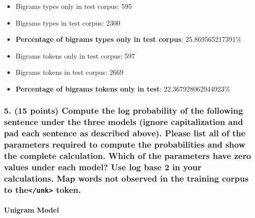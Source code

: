 \documentclass{article}
\begin{document}
\begin{itemize}
\item Bigrams types only in test corpus: 595
\item Bigrams types in test corpus: 2300
\item \textbf{Percentage of bigrams types only in test corpus}: 25.869565217391\%
\item Bigrams tokens only in test corpus: 597
\item Bigrams tokens in test corpus: 2669
\item \textbf{Percentage of bigrams tokens only in test}: 22.367928062944923\%
\end{itemize}

\subsubsection*{5. (15 points) Compute the log probability of the following sentence under the three models (ignore capitalization and pad each sentence as described above). Please list all of the parameters required to compute the probabilities and show the complete calculation. Which of the parameters have zero values under each model? Use log base 2 in your calculations. Map words not observed in the training corpus to the\texttt{</unk>} token.}

\paragraph{Unigram Model}
\end{document}
